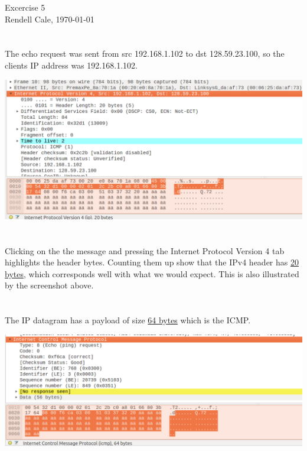 \documentclass{article}
\begin{document}
Excercise 5 \\
Rendell Cale, \today 


\section{}
The echo request was sent from src 192.168.1.102 to dst 128.59.23.100, so the clients IP address was 192.168.1.102. 
\begin{centering}
	\center
	\includegraphics[width=\linewidth]{ip-header.png}
\end{centering}

\section{}
Clicking on the the message and pressing the Internet Protocol Version 4 tab highlights the header bytes. Counting them up show that the IPv4 header has \underline{20 bytes}, which corresponds well with what we would expect. This is also illustrated by the screenshot above. 

\section{}
The IP datagram has a payload of size \underline{64 bytes} which is the ICMP.

\begin{centering}
	\center
	\includegraphics[width=\linewidth]{ip-datagram.png}
\end{centering}
\end{document}
